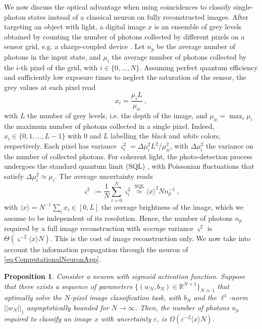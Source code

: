 \documentclass[reprint,
superscriptaddress,
nofootinbib,
aps,
pra,
showkeys
]{revtex4-2}
\newtheorem{proposition}{Proposition}
\begin{document}
\begin{widetext}
We now discuss the optical advantage when using coincidences to classify single-photon states instead of a classical neuron on fully reconstructed images. After targeting an object with light, a digital image $x$ is an ensemble of grey levels obtained by counting the number of photons collected by different pixels on a sensor grid, e.g. a charge-coupled device \citep{art:Boyle}. Let $n_{p}$ be the average number of photons in the input state, and $\mu_i$ the average number of photons collected by the $i$-th pixel of the grid, with $i \in \{0,\ldots,N\}$. Assuming perfect quantum efficiency and sufficiently low exposure times to neglect the saturation of the sensor, the grey values at each pixel read
\begin{equation}
	x_i =  \frac{\mu_iL}{\mu_w} \ ,
\end{equation}
with $L$ the number of grey levels, i.e. the depth of the image, and $\mu_w = \max_{i}\mu_i$ the maximum number of photons collected in a single pixel. Indeed, $x_i \in \{0, 1, \ldots, L-1\}$ with $0$ and $L$ labelling the \emph{black} and \emph{white} colors, respectively. Each pixel has variance $\varsigma_i^2 = \Delta \mu_i^2 L^2/\mu_w^2$, with $\Delta\mu_i^2$ the variance on the number of collected photons. For coherent light, the photo-detection process undergoes the standard quantum limit (SQL) \citep{art:Kolobov, art:Fabre}, with Poissonian fluctuations that satisfy $\Delta\mu_i^2 \simeq \mu_i$. The average uncertainty reads
\begin{equation}
	\varsigma^2 := \frac{1}{N}\sum_{i=0}^{N} \varsigma_i^2 \stackrel{\text{SQL}}{\simeq} \langle x \rangle^2  N n_{p}^{-1} \ ,
	\label{eq:AvgStdDev}
\end{equation}
with $\langle x \rangle = N^{-1}\sum_i x_i \in [0,L]$ the average brightness of the image, which we assume to be independent of its resolution. Hence, the number of photons $n_p$ required by a full image reconstruction with \emph{average} variance $\varsigma^2$ is $\Theta(\varsigma^{-2}\langle x \rangle N)$. This is the cost of image reconstruction only. We now take into account the information propagation through the neuron of \cref{eq:ComputationalNeuronApp}.
\begin{proposition}
Consider a neuron with sigmoid activation function. Suppose that there exists a sequence of parameters $\{ (w_{N} , b_{N}) \in \mathbb{R}^{N+1} \}_{N \gg 1}$ that optimally solve the $N$-pixel image classification task, with $b_N$ and the $\ell^1$-norm $||w_N||_1$ asymptotically bounded for $N \to \infty$. Then, the number of photons $n_p$ required to classify an image $x$ with uncertainty $\varepsilon$, is $\Omega\left(\varepsilon^{-2}\langle x \rangle N\right)$.

\end{proposition}
\end{widetext}
\end{document}
